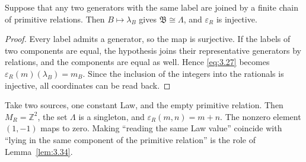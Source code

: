 \begin{lemma}\label{lem:3.34}

Suppose that any two generators with the same label are joined by a finite chain of
primitive relations.
Then $B\mapsto\lambda_B$ gives $\mathfrak{B}\cong\Lambda$, and
$\varepsilon_R$ is injective.

\end{lemma}

\begin{proof}

Every label admits a generator, so the map is surjective.
If the labels of two components are equal, the hypothesis joins their representative
generators by relations, and the components are equal as well.
Hence \eqref{eq:3.27} becomes $\varepsilon_R(m)(\lambda_B)=m_B$.
Since the inclusion of the integers into the rationals is injective, all coordinates
can be read back.

\end{proof}

\begin{example}\label{ex:3.35}

Take two sources, one constant Law, and the empty primitive relation.
Then $M_R=\mathbb{Z}^2$, the set $\Lambda$ is a singleton, and
$\varepsilon_R(m,n)=m+n$.
The nonzero element $(1,-1)$ maps to zero.
Making ``reading the same Law value'' coincide with ``lying in the same component of
the primitive relation'' is the role of Lemma~\ref{lem:3.34}.

\end{example}

